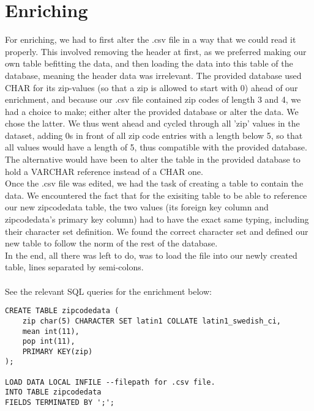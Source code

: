 \section*{Enriching}
For enriching, we had to first alter the .csv file in a way that we could read it properly. This involved removing the header at first, as we preferred making our own table befitting the data, and then loading the data into this table of the database, meaning the header data was irrelevant. The provided database used CHAR for its zip-values (so that a zip is allowed to start with 0) ahead of our enrichment, and because our .csv file contained zip codes of length 3 and 4, we had a choice to make; either alter the provided database or alter the data. We chose the latter. We thus went ahead and cycled through all 'zip' values in the dataset, adding 0s in front of all zip code entries with a length below 5, so that all values would have a length of 5, thus compatible with the provided database. The alternative would have been to alter the table in the provided database to hold a VARCHAR reference instead of a CHAR one. \\
Once the .csv file was edited, we had the task of creating a table to contain the data. We encountered the fact that for the exisiting table to be able to reference our new zipcodedata table, the two values (its foreign key column and zipcodedata's primary key column) had to have the exact same typing, including their character set definition. We found the correct character set and defined our new table to follow the norm of the rest of the database. \\
In the end, all there was left to do, was to load the file into our newly created table, lines separated by semi-colons. \\
\\
See the relevant SQL queries for the enrichment below: \\

\begin{lstlisting}
CREATE TABLE zipcodedata (
	zip char(5) CHARACTER SET latin1 COLLATE latin1_swedish_ci,
	mean int(11),
	pop int(11),
	PRIMARY KEY(zip)
);

LOAD DATA LOCAL INFILE --filepath for .csv file.
INTO TABLE zipcodedata
FIELDS TERMINATED BY ';';
\end{lstlisting}
